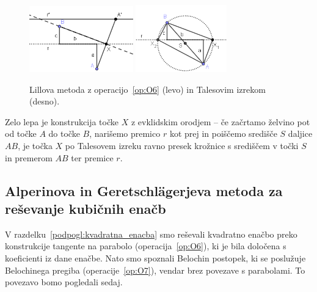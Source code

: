 \begin{figure}[h]
    \centering
    \includegraphics[width=0.4\textwidth]{images/kvadratna_enacba/kvadratna_enacba_lillova_metoda.png}
    \includegraphics[width=0.35\textwidth]{images/kvadratna_enacba/kvadratna_enacba_lillova_metoda_evkl.png}
    \caption[Lillova metoda za kvadratno enačbo]{Lillova metoda z operacijo~\ref{op:O6} (levo) in Talesovim izrekom (desno).}
    \label{fig:kv_en_lill}
\end{figure}

\begin{opomba}
    Zelo lepa je konstrukcija točke $X$ z evklidskim orodjem -- če začrtamo želvino pot od točke $A$ do točke $B$, narišemo premico $r$ kot prej in poiščemo središče $S$ daljice $AB$, je točka $X$ po Talesovem izreku ravno presek krožnice s središčem v točki $S$ in premerom $AB$ ter premice $r$.
\end{opomba}

\subsection{Alperinova in Geretschlägerjeva metoda za reševanje kubičnih enačb}
\label{podpogl:alperin}

V razdelku~\ref{podpogl:kvadratna_enacba} smo reševali kvadratno enačbo preko konstrukcije tangente na parabolo (operacija~\ref{op:O6}), ki je bila določena s koeficienti iz dane enačbe. Nato smo spoznali Belochin postopek, ki se poslužuje Belochinega pregiba (operacije~\ref{op:O7}), vendar brez povezave s parabolami. To povezavo bomo pogledali sedaj.

